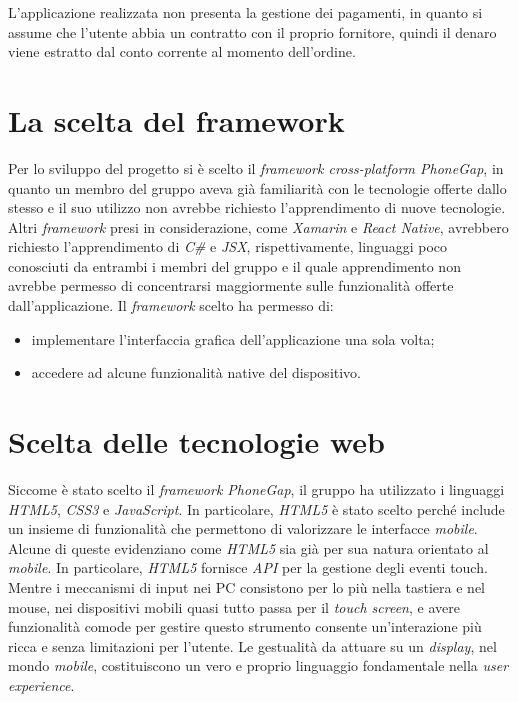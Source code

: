 \documentclass[12pt, a4paper, titlepage]{report}
\begin{document}
	\noindent L'applicazione realizzata non presenta la gestione dei pagamenti, in quanto si assume che l'utente abbia un contratto con il proprio fornitore, quindi il denaro viene estratto dal conto corrente al momento dell'ordine.
	
	\section{La scelta del framework}
	
	Per lo sviluppo del progetto si è scelto il \textit{framework cross-platform PhoneGap}, in quanto un membro del gruppo aveva già familiarità con le tecnologie offerte dallo stesso e il suo utilizzo non avrebbe richiesto l'apprendimento di nuove tecnologie. Altri \textit{framework} presi in considerazione, come \textit{Xamarin} e \textit{React Native}, avrebbero richiesto l'apprendimento di \textit{C\#} e \textit{JSX}, rispettivamente, linguaggi poco conosciuti da entrambi i membri del gruppo e il quale apprendimento non avrebbe permesso di concentrarsi maggiormente sulle funzionalità offerte dall'applicazione. Il \textit{framework} scelto ha permesso di:
	\begin{itemize}
		\item implementare l'interfaccia grafica dell'applicazione una sola volta;
		\item accedere ad alcune funzionalità native del dispositivo.
	\end{itemize}
	
	\section{Scelta delle tecnologie web}
	
	Siccome è stato scelto il \textit{framework PhoneGap}, il gruppo ha utilizzato i linguaggi \textit{HTML5}, \textit{CSS3} e \textit{JavaScript}. In particolare, \textit{HTML5} è stato scelto perché include un insieme di funzionalità che permettono di valorizzare le interfacce \textit{mobile}. Alcune di queste evidenziano come \textit{HTML5} sia già per sua natura orientato al \textit{mobile}. In particolare, \textit{HTML5} fornisce \textit{API} per la gestione degli eventi touch. Mentre i meccanismi di input nei PC consistono per lo più nella tastiera e nel mouse, nei dispositivi mobili quasi tutto passa per il \textit{touch screen}, e avere funzionalità comode per gestire questo strumento consente un'interazione più ricca e senza limitazioni per l'utente. Le gestualità da attuare su un \textit{display}, nel mondo \textit{mobile}, costituiscono un vero e proprio linguaggio fondamentale nella \textit{user experience}.
	\medskip
	
\end{document}
